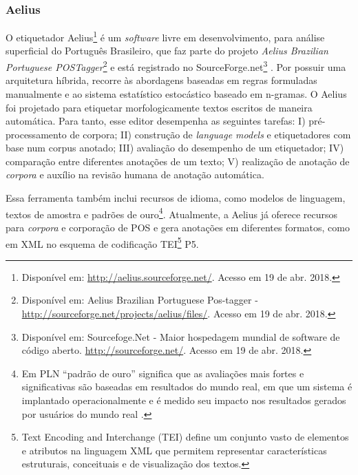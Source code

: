 \documentclass[portuguese]{textolivre}
\begin{document}
\subsubsection{Aelius}\label{sec-idioma}
O etiquetador Aelius\footnote{Disponível em: \url{http://aelius.sourceforge.net/}. Acesso em 19 de abr. 2018.} é um \textit{software} livre em desenvolvimento, para análise superficial do Português Brasileiro, que faz parte do projeto \textit{Aelius Brazilian Portuguese POSTagger}\footnote{Disponível em: Aelius Brazilian Portuguese Pos-tagger - \url{http://sourceforge.net/projects/aelius/files/}. Acesso em 19 de abr. 2018.} e está registrado no SourceForge.net\footnote{Disponível em: Sourcefoge.Net - Maior hospedagem mundial de software de código aberto. \url{http://sourceforge.net/}. Acesso em 19 de abr. 2018.} \cite{alencar_aelius:_2010, alencar_aelius_2013a, alencar_aelius_2013b}. Por possuir uma arquitetura híbrida, recorre às abordagens baseadas em regras formuladas manualmente e ao sistema estatístico estocástico baseado em n-gramas. O Aelius foi projetado para etiquetar morfologicamente textos escritos de maneira automática. Para tanto, esse editor desempenha as seguintes tarefas: I) pré-processamento de corpora; II) construção de \textit{language models} e etiquetadores com base num corpus anotado; III) avaliação do desempenho de um etiquetador; IV) comparação entre diferentes anotações de um texto; V) realização de anotação de \textit{corpora} e auxílio na revisão humana de anotação automática.

Essa ferramenta também inclui recursos de idioma, como modelos de linguagem, textos de amostra e padrões de ouro\footnote{Em PLN “padrão de ouro” significa que as avaliações mais fortes e significativas são baseadas em resultados do mundo real, em que um sistema é implantado operacionalmente e é medido seu impacto nos resultados gerados por usuários do mundo real \cite{reiter_structured_2018}.}. Atualmente, a Aelius já oferece recursos para \textit{corpora} e corporação de POS e gera anotações em diferentes formatos, como em XML no esquema de codificação TEI\footnote{Text Encoding and Interchange (TEI) define um conjunto vasto de elementos e atributos na linguagem XML que permitem representar características estruturais, conceituais e de visualização dos textos.} P5.
\end{document}

